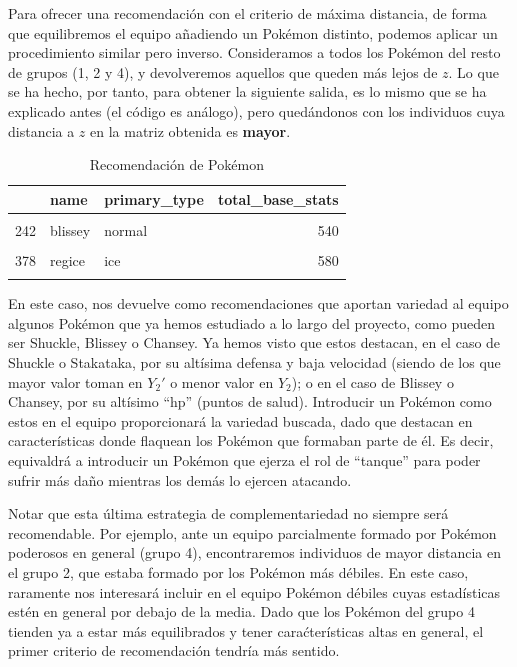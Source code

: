 \documentclass[
  12pt,
]{extreport}
\begin{document}
Para ofrecer una recomendación con el criterio de máxima distancia, de
forma que equilibremos el equipo añadiendo un Pokémon distinto, podemos
aplicar un procedimiento similar pero inverso. Consideramos a todos los
Pokémon del resto de grupos (1, 2 y 4), y devolveremos aquellos que
queden más lejos de \(z\). Lo que se ha hecho, por tanto, para obtener
la siguiente salida, es lo mismo que se ha explicado antes (el código es
análogo), pero quedándonos con los individuos cuya distancia a \(z\) en
la matriz obtenida es \textbf{mayor}.

\begin{table}[H]
\centering
\caption{Recomendación de Pokémon}
\centering
\begin{tabular}[t]{lllr}
\toprule
  & name & primary\_type & total\_base\_stats\\
\midrule
\cellcolor{gray!10}{213} & \cellcolor{gray!10}{shuckle} & \cellcolor{gray!10}{bug} & \cellcolor{gray!10}{505}\\
242 & blissey & normal & 540\\
\cellcolor{gray!10}{113} & \cellcolor{gray!10}{chansey} & \cellcolor{gray!10}{normal} & \cellcolor{gray!10}{450}\\
378 & regice & ice & 580\\
\cellcolor{gray!10}{805} & \cellcolor{gray!10}{stakataka} & \cellcolor{gray!10}{rock} & \cellcolor{gray!10}{570}\\
\bottomrule
\end{tabular}
\end{table}

En este caso, nos devuelve como recomendaciones que aportan variedad al
equipo algunos Pokémon que ya hemos estudiado a lo largo del proyecto,
como pueden ser Shuckle, Blissey o Chansey. Ya hemos visto que estos
destacan, en el caso de Shuckle o Stakataka, por su altísima defensa y
baja velocidad (siendo de los que mayor valor toman en \(Y_2'\) o menor
valor en \(Y_2\)); o en el caso de Blissey o Chansey, por su altísimo
``hp'' (puntos de salud). Introducir un Pokémon como estos en el equipo
proporcionará la variedad buscada, dado que destacan en características
donde flaquean los Pokémon que formaban parte de él. Es decir,
equivaldrá a introducir un Pokémon que ejerza el rol de ``tanque'' para
poder sufrir más daño mientras los demás lo ejercen atacando.

Notar que esta última estrategia de complementariedad no siempre será
recomendable. Por ejemplo, ante un equipo parcialmente formado por
Pokémon poderosos en general (grupo 4), encontraremos individuos de
mayor distancia en el grupo 2, que estaba formado por los Pokémon más
débiles. En este caso, raramente nos interesará incluir en el equipo
Pokémon débiles cuyas estadísticas estén en general por debajo de la
media. Dado que los Pokémon del grupo 4 tienden ya a estar más
equilibrados y tener caraćterísticas altas en general, el primer
criterio de recomendación tendría más sentido.
\end{document}
